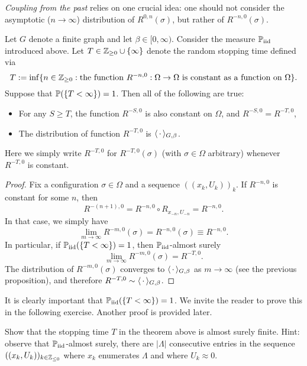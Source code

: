 \emph{Coupling from the past} relies on one crucial idea:
one should not consider the asymptotic ($n\to\infty$) distribution of $R^{0,n}(\sigma)$,
but rather of $R^{-n,0}(\sigma)$.

\begin{theorem}
    \label{thm:coupling_from_the_past}
    Let $G$ denote a finite graph and let $\beta\in[0,\infty)$.
    Consider the measure $\Piid$ introduced above.
    Let $T\in\Z_{\geq 0}\cup\{\infty\}$ denote the random stopping time
    defined via
    \[
        T:=\inf\{n\in\Z_{\geq 0}:\text{the function $R^{-n,0}:\Omega\to\Omega$ is constant as a function on $\Omega$}\}.
    \]
    Suppose that $\P(\{T<\infty\})=1$.
    Then all of the following are true:
    \begin{itemize}
        \item For any $S\geq T$, the function $R^{-S,0}$ is also constant on $\Omega$, and $R^{-S,0}=R^{-T,0}$,
        \item The distribution of function $R^{-T,0}$ is $\langle\blank\rangle_{G,\beta}$.
    \end{itemize}
    Here we simply write $R^{-T,0}$ for $R^{-T,0}(\sigma)$ (with $\sigma\in\Omega$ arbitrary)
    whenever $R^{-T,0}$ is constant.
\end{theorem}

\begin{proof}
    Fix a configuration $\sigma\in\Omega$
    and a sequence $((x_k,U_k))_k$.
    If $R^{-n,0}$ is constant for some $n$, then
    \[
            R^{-(n+1),0}=R^{-n,0}\circ R_{x_{-n},U_{-n}}=R^{-n,0}.
    \]
    In that case, we simply have
    \[
        \lim_{m\to\infty}R^{-m,0}(\sigma)=R^{-n,0}(\sigma)\equiv R^{-n,0}.
    \]
    In particular, if $\Piid(\{T<\infty\})=1$,
    then $\Piid$-almost surely
    \[
        \lim_{m\to\infty} R^{-m,0}(\sigma)=R^{-T,0}.
    \]
    The distribution of $R^{-m,0}(\sigma)$ converges to $\langle\blank\rangle_{G,\beta}$
    as $m\to\infty$ (see the previous proposition),
    and therefore $R^{-T,0}\sim\langle\blank\rangle_{G,\beta}$.
\end{proof}

It is clearly important that $\Piid(\{T<\infty\})=1$.
We invite the reader to prove this in the following exercise.
Another proof is provided later.

\begin{exercise}
    Show that the stopping time $T$ in the theorem above is almost surely finite.
    Hint: observe that $\Piid$-almost surely,
    there are $|\Lambda|$ consecutive entries in the sequence $((x_k,U_k))_{k\in\Z_{\leq 0}}$
    where $x_k$ enumerates $\Lambda$ and where $U_k\approx 0$.
\end{exercise}

